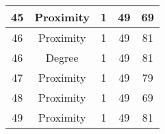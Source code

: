 \documentclass[results.tex]{subfiles}
\begin{document}
\begin{center}
\begin{tabular}{| c || c | c | c | c |}
            \hline
            45                      & Proximity                    & 1                      & 49                      & 69                   \\
            \hline
            46                      & Proximity                    & 1                      & 49                      & 81                   \\
            \hline
            46                      & Degree                       & 1                      & 49                      & 81                   \\
            \hline
            47                      & Proximity                    & 1                      & 49                      & 79                   \\
            \hline
            48                      & Proximity                    & 1                      & 49                      & 69                   \\
            \hline
            49                      & Proximity                    & 1                      & 49                      & 81                   \\
            \hline
        \end{tabular}
    \end{center}
\end{document}
